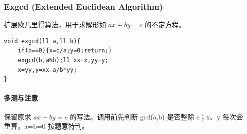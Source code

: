 \subsubsection{Exgcd (Extended Euclidean Algorithm)}
扩展欧几里得算法，用于求解形如 $ax + by = c$ 的不定方程。
\begin{lstlisting}
void exgcd(ll a,ll b){
	if(b==0){x=c/a;y=0;return;}
	exgcd(b,a%b);ll xx=x,yy=y;
	x=yy,y=xx-a/b*yy;
}
\end{lstlisting}

\paragraph{多测与注意} 保留原求 $ax+by=c$ 的写法。调用前先判断 gcd(a,b) 是否整除 c；x、y 每次会重算，a=b=0 按题意特判。
